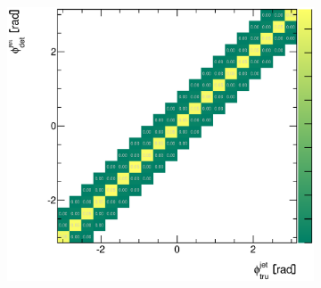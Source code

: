 \documentclass[12pt, twoside]{article}
\numberwithin{equation}{section}
\numberwithin{figure}{section}
\newenvironment{changemargin}[2]{%
\begin{list}{}{%
\setlength{\topsep}{0pt}%
\setlength{\leftmargin}{#1}%
\setlength{\rightmargin}{#2}%
\setlength{\listparindent}{\parindent}%
\setlength{\itemindent}{\parindent}%
\setlength{\parsep}{\parskip}%
}%
\item[]}{\end{list}}
\begin{document}
\begin{figure}
\begin{changemargin}{-1.0cm}{-0.75cm}
\begin{changemargin}{-0.75cm}{-1.0cm}
\begin{subfigure}[b]{0.37\textwidth}
            \subcaption{}
            \label{fig:PythiaCorrelationRapidityJet}
        \end{subfigure}
        \begin{subfigure}[b]{0.37\textwidth}
            \includegraphics[width=\textwidth]{./images/CorrelationMatricesPythia/REC_vs_HAD(DP+FP)-106.eps}
            \subcaption{}
            \label{fig:PythiaCorrelationPhiJet}
        \end{subfigure}


\end{changemargin}
\end{changemargin}
\end{figure}
\end{document}
